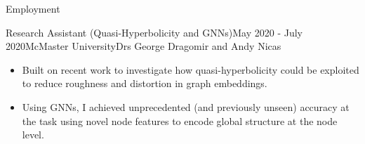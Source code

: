 \begin{rSection}{Employment}

\begin{rSubsection}{Research Assistant (Quasi-Hyperbolicity and GNNs)}{May 2020 - July 2020}{McMaster University}{Drs George Dragomir and Andy Nicas}
    \begin{itemize}
      \addtolength\itemsep{-0.5em}
      \item Built on recent work to investigate how quasi-hyperbolicity could be exploited to reduce roughness and distortion in graph embeddings.
      \item Using GNNs, I achieved unprecedented (and previously unseen) accuracy at the task using novel node features to encode global structure at the node level.
    \end{itemize}
\end{rSubsection}




\end{rSection}
